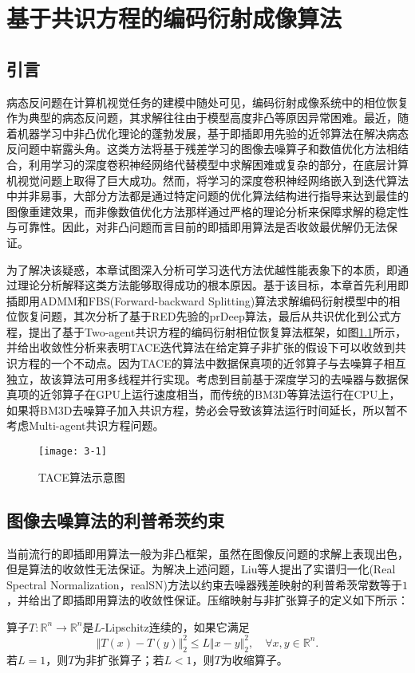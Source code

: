 \chapter{基于共识方程的编码衍射成像算法}
\label{chap:ce}
\section{引言}
病态反问题在计算机视觉任务的建模中随处可见，编码衍射成像系统中的相位恢复作为典型的病态反问题，其求解往往由于模型高度非凸等原因异常困难。最近，随着机器学习中非凸优化理论的蓬勃发展，基于即插即用先验的近邻算法在解决病态反问题中崭露头角。这类方法将基于残差学习的图像去噪算子和数值优化方法相结合，利用学习的深度卷积神经网络代替模型中求解困难或复杂的部分，在底层计算机视觉问题上取得了巨大成功。然而，将学习的深度卷积神经网络嵌入到迭代算法中并非易事，大部分方法都是通过特定问题的优化算法结构进行指导来达到最佳的图像重建效果，而非像数值优化方法那样通过严格的理论分析来保障求解的稳定性与可靠性。因此，对非凸问题而言目前的即插即用算法是否收敛最优解仍无法保证。

为了解决该疑惑，本章试图深入分析可学习迭代方法优越性能表象下的本质，即通过理论分析解释这类方法能够取得成功的根本原因。基于该目标，本章首先利用即插即用ADMM和FBS(Forward-backward Splitting)算法求解编码衍射模型中的相位恢复问题，其次分析了基于RED先验的prDeep算法，最后从共识优化到公式方程，提出了基于Two-agent共识方程的编码衍射相位恢复算法框架，如图\ref{fig:3-1}所示，并给出收敛性分析来表明TACE迭代算法在给定算子非扩张的假设下可以收敛到共识方程的一个不动点。因为TACE的算法中数据保真项的近邻算子与去噪算子相互独立，故该算法可用多线程并行实现。考虑到目前基于深度学习的去噪器与数据保真项的近邻算子在GPU上运行速度相当，而传统的BM3D等算法运行在CPU上，如果将BM3D去噪算子加入共识方程，势必会导致该算法运行时间延长，所以暂不考虑Multi-agent共识方程问题。
\begin{figure}[!hptb]
	\centering
	\texttt{[image: 3-1]}
	\caption{TACE算法示意图}\label{fig:3-1}
\end{figure}

\section{图像去噪算法的利普希茨约束}
当前流行的即插即用算法一般为非凸框架，虽然在图像反问题的求解上表现出色，但是算法的收敛性无法保证。为解决上述问题，Liu等人提出了实谱归一化(Real Spectral Normalization，realSN)方法以约束去噪器残差映射的利普希茨常数等于$1$，并给出了即插即用算法的收敛性保证\supercite{Ernest}。压缩映射与非扩张算子的定义如下所示：
\begin{definition} \label{def:3-1}
	算子$T:\mathbb{R}^n\to\mathbb{R}^n$是$L$-Lipschitz连续的，如果它满足
	\begin{equation}
		\Vert{T(x)-T(y)}\Vert_2^2\leq{L}\Vert{x-y}\Vert_2^2,\quad{\forall{x,y\in\mathbb{R}^n}}.
	\end{equation}
	若$L=1$，则$T$为非扩张算子；若$L<1$，则$T$为收缩算子。
\end{definition}

